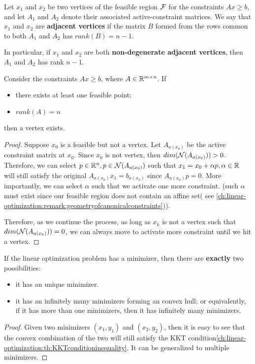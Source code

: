\begin{refsection}
\begin{definition}\label{ch:linear-optimization:def:adjacentvertex}
Let $x_1$ and $x_2$ be two vertices of the feasible region $\mathcal{F}$ for the constraints $Ax \geq b$, and let $A_1$ and $A_2$ denote their associated active-constraint matrices. We say that $x_1$ and $x_2$ are \textbf{adjacent vertices} if the matrix $B$ formed from the rows  common to both $A_1$ and $A_2$ has $rank(B) = n-1$.

In particular, if $x_1$ and $x_2$ are both \textbf{non-degenerate adjacent vertices}, then $A_1$ and $A_2$ has rank $n-1$.
\end{definition}


\begin{lemma}\label{ch:linear-optimization:th:vertexexistencetheorem}
Consider the constraints $Ax \geq b$, where $A \in \mathbb{R}^{m\times n}$. If
\begin{itemize}
	\item there exists at least one feasible point;
	\item $rank(A) = n$
\end{itemize}
then a vertex exists.
\end{lemma}
\begin{proof}
	Suppose $x_0$ is a feasible but not a vertex. Let $A_{a(x_0)}$ be the active constraint matrix at $x_0$. Since $x_0$ is not vertex, then $dim(\mathcal{N}(A_{a(x_0)})) > 0$. Therefore, we can select $p\in \mathbb{R}^n, p\in \mathcal{N}(A_{a(x_0)})$ such that $x_1 = x_0 + \alpha p, \alpha \in \mathbb{R}$ will still satisfy the original $A_{a(x_0)}x_1 = b_{a(x_0)}$ since $A_{a(x_0)}p = 0$. More importantly, we can select $\alpha$ such that we activate one more constraint. (such $\alpha$ must exist since our feasible region does not contain an affine set( see \autoref{ch:linear-optimization:remark:geometryofcanonicalconstraints})).
	
	Therefore, as we continue the process,  as long as $x_k$ is not a vertex such that  $dim(\mathcal{N}(A_{a(x_k)})) = 0$, we can always move to activate more constraint until we hit a vertex.
\end{proof}

\begin{lemma}
If the linear optimization problem has a minimizer, then there are \textbf{exactly} two possibilities:
\begin{itemize}
	\item it has an unique minimizer.
	\item it has an infinitely many minimizers forming an convex hull; or equivalently, if it has more than one minimizers, then it has infinitely many minimizers.
\end{itemize}
\end{lemma}
\begin{proof}
Given two minimizers $(x_1,y_1)$ and $(x_2,y_2)$, then it is easy to see that the convex combination of the two will still satisfy the KKT condition\autoref{ch:linear-optimization:th:KKTconditioninequality}. It can be generalized to multiple minimizers.
\end{proof}





\end{refsection}
